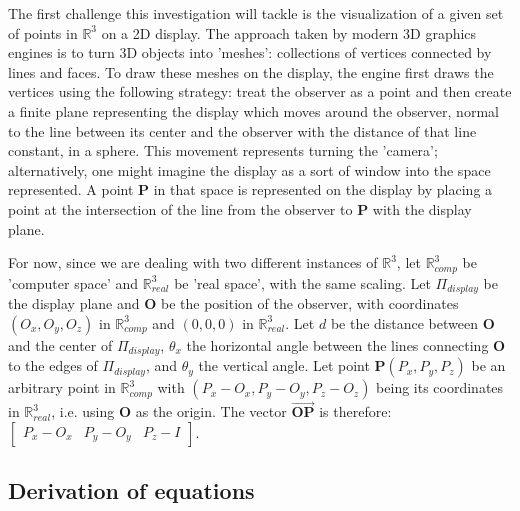 \documentclass[12pt, a4paper]{article}
\begin{document}
    The first challenge this investigation will tackle is the
    visualization of a given set of points in $\mathbb{R}^3$ on
    a 2D display. The approach taken by modern 3D graphics
    engines is to turn 3D objects into 'meshes': collections of
    vertices connected by lines and faces. To draw these meshes
    on the display, the engine first draws the vertices using
    the following strategy: treat the observer as a point and
    then create a finite plane representing the display which
    moves around the observer, normal to the line between its
    center and the observer with the distance of that line
    constant, in a sphere. This movement represents turning the
    'camera'; alternatively, one might imagine the display as a
    sort of window into the space represented. A point
    \textbf{P} in that space is represented on the display by
    placing a point at the intersection of the line from the
    observer to \textbf{P} with the display plane.
    
    \par
    
    For now, since we are dealing with two different instances
    of $\mathbb{R}^3$, let $\mathbb{R}^3_{comp}$ be 'computer
    space' and $\mathbb{R}^3_{real}$ be 'real space', with the
    same scaling. Let $\Pi_{display}$ be the display plane and
    $\textbf{O}$ be the position of the observer, with
    coordinates $(O_x, O_y, O_z)$ in $\mathbb{R}^3_{comp}$ and
    $(0, 0, 0)$ in $\mathbb{R}^3_{real}$. Let $d$ be the
    distance between $\textbf{O}$ and the center of
    $\Pi_{display}$, $\theta_x$ the horizontal angle between the
    lines connecting $\textbf{O}$ to the edges of
    $\Pi_{display}$, and $\theta_y$ the vertical angle. Let
    point $\textbf{P}(P_x, P_y, P_z)$ be an arbitrary point in
    $\mathbb{R}^3_{comp}$ with $(P_x - O_x, P_y - O_y, P_z -
    O_z)$ being its coordinates in $\mathbb{R}^3_{real}$, i.e.
    using $\textbf{O}$ as the origin. The vector
    $\overrightarrow{\textbf{OP}}$ is therefore: $
        \begin{bmatrix}
        P_x - O_x & P_y - O_y & P_z - I
        \end{bmatrix}
    $. 
    
    \subsection{Derivation of equations}
    
\end{document}

